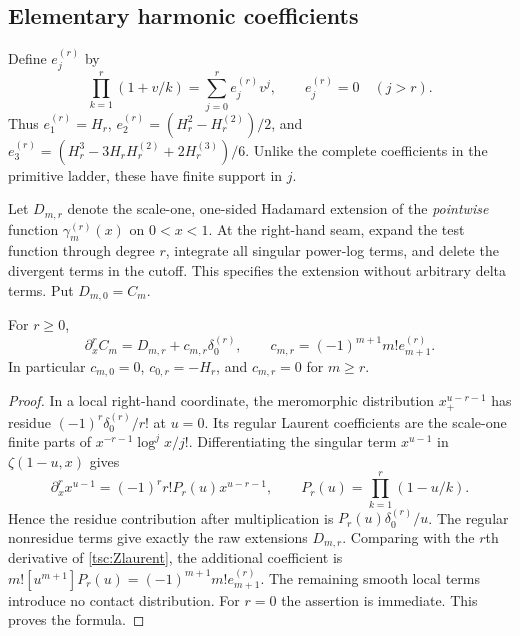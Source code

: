 \subsection{Elementary harmonic coefficients}
Define $e_j^{(r)}$ by
\begin{equation}\label{tsc:elementary}
 \prod_{k=1}^r(1+v/k)=\sum_{j=0}^r e_j^{(r)}v^j,
 \qquad e_j^{(r)}=0\quad(j>r).
\end{equation}
Thus $e_1^{(r)}=H_r$,
$e_2^{(r)}=(H_r^2-H_r^{(2)})/2$, and
$e_3^{(r)}=(H_r^3-3H_rH_r^{(2)}+2H_r^{(3)})/6$.
Unlike the complete coefficients in the primitive ladder, these have finite
support in $j$.

Let $D_{m,r}$ denote the scale-one, one-sided Hadamard extension of the
\emph{pointwise} function $\gamma_m^{(r)}(x)$ on $0<x<1$. At the right-hand
seam, expand the test function through degree $r$, integrate all singular
power-log terms, and delete the divergent terms in the cutoff. This
specifies the extension without arbitrary delta terms. Put $D_{m,0}=C_m$.

\begin{theorem}\label{tsc:contact-single}
For $r\ge0$,
\begin{equation}\label{tsc:single-contact}
 \partial_x^r C_m=D_{m,r}+c_{m,r}\delta_0^{(r)},
 \qquad c_{m,r}=(-1)^{m+1}m!e_{m+1}^{(r)}.
\end{equation}
In particular $c_{m,0}=0$, $c_{0,r}=-H_r$, and $c_{m,r}=0$ for $m\ge r$.
\end{theorem}
\begin{proof}
In a local right-hand coordinate, the meromorphic distribution
$x_+^{u-r-1}$ has residue
$(-1)^r\delta_0^{(r)}/r!$ at $u=0$. Its regular Laurent coefficients
are the scale-one finite parts of $x^{-r-1}\log^j x/j!$.
Differentiating the singular term $x^{u-1}$ in
$\zeta(1-u,x)$ gives
\[
 \partial_x^r x^{u-1}=(-1)^r r!P_r(u)x^{u-r-1},
 \qquad P_r(u)=\prod_{k=1}^r(1-u/k).
\]
Hence the residue contribution after multiplication is
$P_r(u)\delta_0^{(r)}/u$. The regular nonresidue terms give exactly the
raw extensions $D_{m,r}$. Comparing with the $r$th derivative of
\eqref{tsc:Zlaurent}, the additional coefficient is
$m![u^{m+1}]P_r(u)=(-1)^{m+1}m!e_{m+1}^{(r)}$.
The remaining smooth local terms introduce no contact distribution.
For $r=0$ the assertion is immediate. This proves the formula.
\end{proof}

